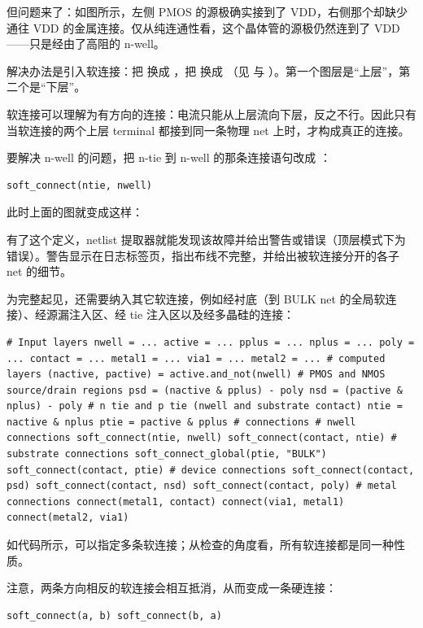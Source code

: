 但问题来了：如图所示，左侧 PMOS 的源极确实接到了 VDD，右侧那个却缺少通往 VDD 的金属连接。仅从纯连通性看，这个晶体管的源极仍然连到了 VDD——只是经由了高阻的 n-well。

解决办法是引入软连接：把  换成 ，把  换成 （见  与 ）。第一个图层是“上层”，第二个是“下层”。

软连接可以理解为有方向的连接：电流只能从上层流向下层，反之不行。因此只有当软连接的两个上层 terminal 都接到同一条物理 net 上时，才构成真正的连接。

要解决 n-well 的问题，把 n-tie 到 n-well 的那条连接语句改成 ：

\begin{lstlisting}
soft_connect(ntie, nwell)
\end{lstlisting}

此时上面的图就变成这样：


有了这个定义，netlist 提取器就能发现该故障并给出警告或错误（顶层模式下为错误）。警告显示在日志标签页，指出布线不完整，并给出被软连接分开的各子 net 的细节。

为完整起见，还需要纳入其它软连接，例如经衬底（到 BULK net 的全局软连接）、经源漏注入区、经 tie 注入区以及经多晶硅的连接：

\begin{lstlisting}
# Input layers nwell = ... active = ... pplus = ... nplus = ... poly = ... contact = ... metal1 = ... via1 = ... metal2 = ... # computed layers (nactive, pactive) = active.and_not(nwell) # PMOS and NMOS source/drain regions psd = (nactive & pplus) - poly nsd = (pactive & nplus) - poly # n tie and p tie (nwell and substrate contact) ntie = nactive & nplus ptie = pactive & pplus # connections # nwell connections soft_connect(ntie, nwell) soft_connect(contact, ntie) # substrate connections soft_connect_global(ptie, "BULK") soft_connect(contact, ptie) # device connections soft_connect(contact, psd) soft_connect(contact, nsd) soft_connect(contact, poly) # metal connections connect(metal1, contact) connect(via1, metal1) connect(metal2, via1)
\end{lstlisting}

如代码所示，可以指定多条软连接；从检查的角度看，所有软连接都是同一种性质。

注意，两条方向相反的软连接会相互抵消，从而变成一条硬连接：

\begin{lstlisting}
soft_connect(a, b) soft_connect(b, a)
\end{lstlisting}

